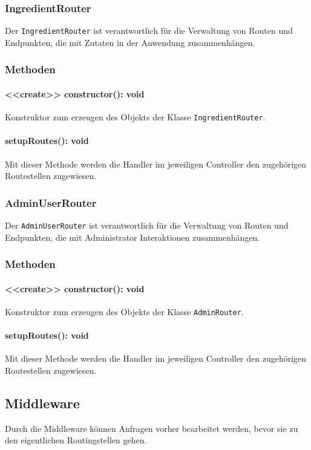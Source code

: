 \documentclass{entwurfsheft}
\begin{document}
\subsubsection{IngredientRouter}\label{sec:IngredientRouter}
Der \texttt{IngredientRouter} ist verantwortlich für die Verwaltung von Routen und Endpunkten, die mit Zutaten in der Anwendung zusammenhängen.
\subsubsection*{Methoden}
\paragraph{<<create>> constructor(): void}
Konstruktor zum erzeugen des Objekts der Klasse \texttt{IngredientRouter}.
\paragraph{setupRoutes(): void}
Mit dieser Methode werden die Handler im jeweiligen Controller den zugehörigen Routestellen zugewiesen.

\subsubsection{AdminUserRouter}\label{sec:AdminUserRouter}
Der \texttt{AdminUserRouter} ist verantwortlich für die Verwaltung von Routen und Endpunkten, die mit Administrator Interaktionen zusammenhängen.
\subsubsection*{Methoden}
\paragraph{<<create>> constructor(): void}
Konstruktor zum erzeugen des Objekts der Klasse \texttt{AdminRouter}.
\paragraph{setupRoutes(): void}
Mit dieser Methode werden die Handler im jeweiligen Controller den zugehörigen Routestellen zugewiesen.

\newpage

\subsection{Middleware}
Durch die Middleware können Anfragen vorher bearbeitet werden, bevor sie zu den eigentlichen Routingstellen gehen.
\end{document}

